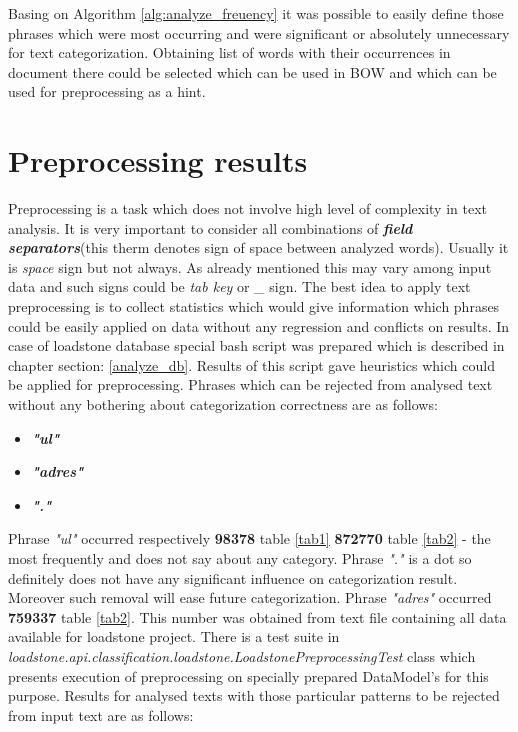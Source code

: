 Basing on Algorithm \ref{alg:analyze_freuency} it was possible to easily define those phrases which were most occurring and were significant or absolutely unnecessary for text categorization. Obtaining list of words with their occurrences in document there could be selected which can be used in BOW and which can be used for preprocessing as a hint.

\section{Preprocessing results}
Preprocessing is a task which does not involve high level of complexity in text analysis. It is very important to consider all combinations of \textit{\textbf{field separators}}(this therm denotes sign of space between analyzed words). Usually it is \textit{space} sign but not always. As already mentioned this may vary among input data and such signs could be \textit{tab key} or \textit{\_} sign. The best idea to apply text preprocessing is to collect statistics which would give information which phrases could be easily applied on data without any regression and conflicts on results. In case of loadstone database special bash script was prepared which is described in chapter section: \ref{analyze_db}. Results of this script gave heuristics which could be applied for preprocessing.
Phrases which can be rejected from analysed text without any bothering about categorization correctness are as follows:
\newline
\begin{itemize}
	\item \textbf{\textit{"ul"}}
	\item \textbf{\textit{"adres"}}
	\item \textbf{\textit{"."}}
\end{itemize}
Phrase \textit{"ul"} occurred respectively \textbf{98378} table \ref{tab1} \textbf{872770} table \ref{tab2} - the most frequently and does not say about any category. Phrase \textit{"."} is a dot so definitely does not have any significant influence on categorization result. Moreover such removal will ease future categorization. Phrase \textit{"adres"} occurred \textbf{759337} table \ref{tab2}. This number was obtained from text file containing all data available for loadstone project. There is a test suite in \textit{loadstone.api.classification.loadstone.LoadstonePreprocessingTest} class which presents execution of preprocessing on specially prepared DataModel's for this purpose. Results for analysed texts with those particular patterns to be rejected from input text are as follows:


